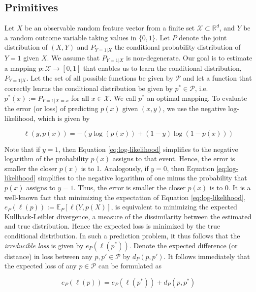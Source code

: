 \documentclass[11pt,a4paper]{article}
\theoremstyle{definition}
\begin{document}
\subsection{Primitives}
\label{subsec:primitives}
Let \(X\) be an observable random feature vector from a finite set \(\mathcal{X}\subset \mathbb{R}^{d}\), and \(Y\) be a random outcome variable taking values in \(\{0,1\}\). Let \(P\) denote the joint distribution of \((X,Y)\) and \(P_{Y=1|X}\) the conditional probability distribution of \(Y=1\) given \(X\).  We assume that \(P_{Y=1|X}\) is non-degenerate.  Our goal is to estimate a mapping \(p:\mathcal{X}\to[0,1]\) that enables us to learn the conditional distribution, \(P_{Y=1|X}\).  Let the set of all possible functions be given by \(\mathcal{P}\) and let a function that correctly learns the conditional distribution be given by \(p^{*}\in\mathcal{P}\), i.e. \(p^{*}(x):=P_{Y=1|X=x}\) for all \(x\in\mathcal{X}\). We call \(p^{*}\) an optimal mapping. To evaluate the error (or loss) of predicting \(p(x)\) given \((x,y)\), we use the negative log-likelihood, which is given by


\begin{equation}
\label{eq:log-likelihood}
\ell(y,p(x))=-\left(y\log(p(x))+(1-y)\log(1-p(x))\right)
\end{equation}

Note that if \(y=1\), then Equation \eqref{eq:log-likelihood} simplifies to the negative logarithm of the probability \(p(x)\) assigns to that event. Hence, the error is smaller the closer \(p(x)\) is to 1. Analogously, if \(y=0\), then Equation \eqref{eq:log-likelihood} simplifies to the negative logarithm of one minus the probability that \(p(x)\) assigns to \(y=1\). Thus, the error is smaller the closer \(p(x)\) is to 0. It is a well-known fact that minimizing the expectation of Equation \eqref{eq:log-likelihood}, \(e_P(\ell(p)):=\mathbb{E}_P[\ell(Y,p(X)]\), is equivalent to minimizing the expected Kullback-Leibler divergence, a measure of the dissimilarity between the estimated and true distribution. Hence the expected loss is minimized by the true conditional distribution. In such a prediction problem, it thus follows that the \emph{irreducible loss} is given by \(e_P(\ell(p^*))\).  Denote the expected difference (or distance) in loss between any \(p,p'\in\mathcal{P}\) by \(d_P(p,p')\). It follows immediately that the expected loss of any \(p\in\mathcal{P}\) can be formulated as

\begin{equation}
e_P(\ell(p))=e_P(\ell(p^{*}))+d_P(p,p^{*})
\end{equation}
\end{document}
